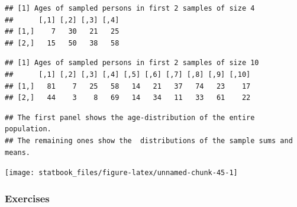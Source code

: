 \documentclass[]{book}
\begin{document}
\begin{verbatim}
## [1] Ages of sampled persons in first 2 samples of size 4
##      [,1] [,2] [,3] [,4]
## [1,]    7   30   21   25
## [2,]   15   50   38   58
\end{verbatim}

\begin{verbatim}
## [1] Ages of sampled persons in first 2 samples of size 10
##      [,1] [,2] [,3] [,4] [,5] [,6] [,7] [,8] [,9] [,10]
## [1,]   81    7   25   58   14   21   37   74   23    17
## [2,]   44    3    8   69   14   34   11   33   61    22
\end{verbatim}

\begin{verbatim}
## The first panel shows the age-distribution of the entire population.
## The remaining ones show the  distributions of the sample sums and means.
\end{verbatim}

\begin{center}\texttt{[image: statbook\_files/figure-latex/unnamed-chunk-45-1]} \end{center}

\hypertarget{exercises-2}{%
\subsubsection{Exercises}\label{exercises-2}}
\end{document}
